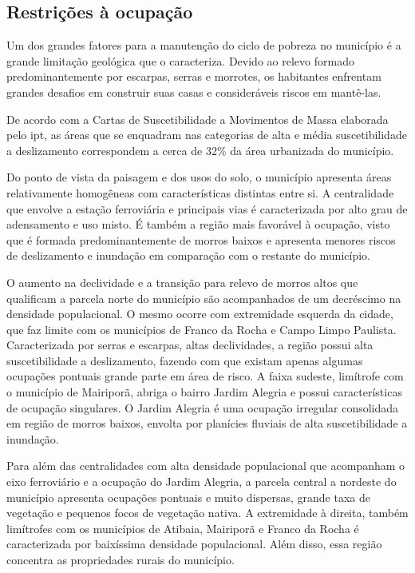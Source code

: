     \subsection{Restrições à ocupação}
    
    Um dos grandes fatores para a manutenção do ciclo de pobreza no município é a grande limitação geológica que o caracteriza. Devido ao relevo formado predominantemente por escarpas, serras e morrotes, os habitantes enfrentam grandes desafios em construir suas casas e consideráveis riscos em mantê-las. 

    De acordo com a Cartas de Suscetibilidade a Movimentos de Massa elaborada pelo \gls{ipt}, as áreas que se enquadram nas categorias de alta e média suscetibilidade a deslizamento correspondem a cerca de 32\% da área urbanizada do município.
    
    Do ponto de vista da paisagem e dos usos do solo, o município apresenta áreas relativamente homogêneas com características distintas entre si. A centralidade que envolve a estação ferroviária e principais vias é caracterizada por alto grau de adensamento e uso misto. É também a região mais favorável à ocupação, visto que é formada predominantemente de morros baixos e apresenta menores riscos de deslizamento e inundação em comparação com o restante do município. 
    
    O aumento na declividade e a transição para relevo de morros altos que qualificam a parcela norte do município são acompanhados de um decréscimo na densidade populacional. O mesmo ocorre com extremidade esquerda da cidade, que faz limite com os municípios de Franco da Rocha e Campo Limpo Paulista. Caracterizada por serras e escarpas, altas declividades, a região possui alta suscetibilidade a deslizamento, fazendo com que existam apenas algumas ocupações pontuais \textendash grande parte em área de risco. A faixa sudeste, limítrofe com o município de Mairiporã, abriga o bairro Jardim Alegria e possui características de ocupação singulares. O Jardim Alegria é uma ocupação irregular consolidada em região de morros baixos, envolta por planícies fluviais de alta suscetibilidade a inundação. 
    
    Para além das centralidades com alta densidade populacional que acompanham o eixo ferroviário e a ocupação do Jardim Alegria, a parcela central a nordeste do município apresenta ocupações pontuais e muito dispersas, grande taxa de vegetação e pequenos focos de vegetação nativa. A extremidade à direita, também limítrofes com os municípios de Atibaia, Mairiporã e Franco da Rocha é caracterizada por baixíssima densidade populacional. Além disso, essa região concentra as propriedades rurais do município. 

